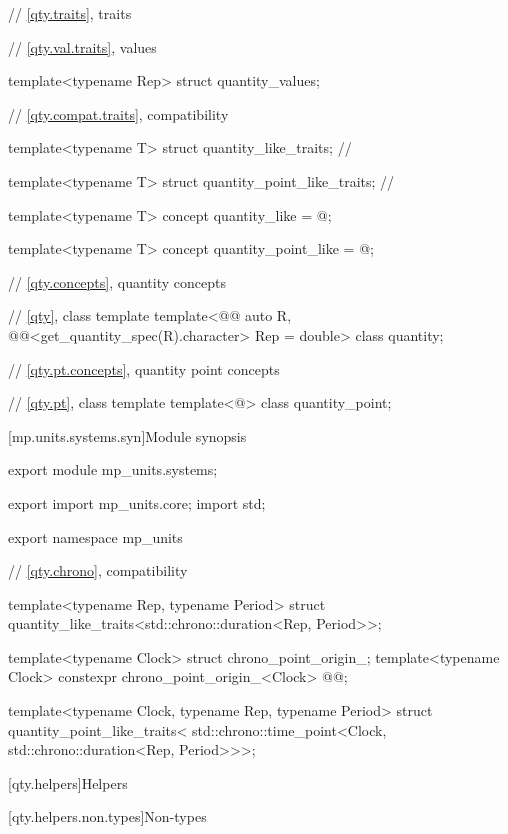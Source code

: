\begin{codeblock}
{// \ref{qty.traits}, traits

// \ref{qty.val.traits}, values

template<typename Rep>
struct quantity_values;

// \ref{qty.compat.traits}, compatibility

template<typename T>
struct quantity_like_traits; // \notdef

template<typename T>
struct quantity_point_like_traits; // \notdef

template<typename T>
concept quantity_like = @\seebelownc@;

template<typename T>
concept quantity_point_like = @\seebelownc@;

// \ref{qty.concepts}, quantity concepts

// \ref{qty}, class template 
template<@@ auto R, @@<get_quantity_spec(R).character> Rep = double>
class quantity;

// \ref{qty.pt.concepts}, quantity point concepts

// \ref{qty.pt}, class template 
template<@\unspec@>
class quantity_point;

}
\end{codeblock}

[mp.units.systems.syn]{Module  synopsis}
%
\begin{codeblock}
export module mp_units.systems;

export import mp_units.core;
import std;

export namespace mp_units {

// \ref{qty.chrono},  compatibility

template<typename Rep, typename Period>
struct quantity_like_traits<std::chrono::duration<Rep, Period>>;

template<typename Clock>
struct chrono_point_origin_;
template<typename Clock>
constexpr chrono_point_origin_<Clock> @@{};

template<typename Clock, typename Rep, typename Period>
struct quantity_point_like_traits<
  std::chrono::time_point<Clock, std::chrono::duration<Rep, Period>>>;

}
\end{codeblock}

[qty.helpers]{Helpers}

[qty.helpers.non.types]{Non-types}

